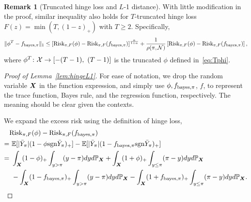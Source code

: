 \documentclass[11pt]{article}
\theoremstyle{plain}
\theoremstyle{definition}
\newtheorem{rmk}{Remark}
\def\sign{\textup{sgn}}
\def\bayespif{f_{\textup{bayes},\pi}}
\def\shift{\bar Y_\pi}
\def\riskF{\textup{Risk}_{\pi,F}}
\begin{document}
\begin{rmk}[Truncated hinge loss and $L$-1 distance]\label{rmk:truncate}With little modification in the proof, similar inequality also holds for $T$-truncated hinge loss $F(z)=\min(T,(1-z)_{+})$ with $T\geq 2$. Specifically, 
\[
\onenormSize{}{\phi^T-\bayespif}\leq \left[\riskF(\phi)-\riskF(\bayespif)\right]^{\alpha\over 1+\alpha}+
 {1\over \rho(\pi, \tN)}\left[\riskF(\phi)-\riskF(\bayespif)\right],
\]
where $\phi^T\colon\tX\to[-(T-1),\ (T-1)]$ is the truncated $\phi$ defined in~\eqref{eq:Tphi}.
\end{rmk}


\begin{proof}[Proof of Lemma~\ref{lem:hingeL1}] For ease of notation, we drop the random variable $\bm X$ in the function expression, and simply use $\phi, \bayespif$, $f$, to represent the trace function, Bayes rule, and the regression function, respectively. The meaning should be clear given the contexts. 

We expand the excess risk using the definition of hinge loss,
\begin{align}\label{eq:function}
&\riskF(\phi)-\riskF(\bayespif)\notag\\
=&\  \mathbb{E}[|\shift|(1-\phi\sign\shift)_{+}]-\mathbb{E}[|\shift|(1-\bayespif\sign\shift)_{+}] \notag\\
= &\ \int_{\mX} (1-\phi)_{+} \int_{y>\pi}(y-\pi)dy d\mathbb{P}_{\mX}+\int_{\mX}(1+\phi)_{+}  \int_{y\leq \pi}(\pi-y)dy d\mathbb{P}_{\mX} \notag \\
&\ -\int_{\mX} (1-\bayespif)_{+} \int_{y>\pi}(y-\pi)dy d\mathbb{P}_{\mX}-\int_{\mX}(1+\bayespif)_{+}  \int_{y\leq \pi}(\pi-y)dy d\mathbb{P}_{\mX}.
\end{align}


\end{proof}
\end{document}
